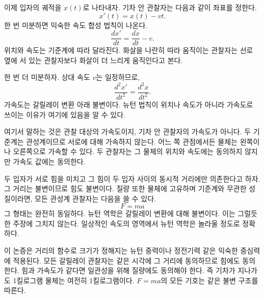 \begin{classroomqa}
\end{classroomqa}

이제 입자의 궤적을 \(x(t)\)로 나타내자. 기차 안 관찰자는 다음과 같이 좌표를 정한다.
\begin{equation}
x'(t)=x(t)-vt.
\end{equation}
한 번 미분하면 익숙한 속도 합성 법칙이 나온다.
\begin{equation}
\frac{dx'}{dt}=\frac{dx}{dt}-v.
\end{equation}
위치와 속도는 기준계에 따라 달라진다. 화살을 나란히 따라 움직이는 관찰자는 선로 옆에 서 있는 관찰자보다 화살이 더 느리게 움직인다고 본다.

한 번 더 미분하자. 상대 속도 \(v\)는 일정하므로,
\begin{equation}
\frac{d^2x'}{dt^2}=\frac{d^2x}{dt^2}.
\end{equation}
가속도는 갈릴레이 변환 아래 불변이다. 뉴턴 법칙이 위치나 속도가 아니라 가속도로 쓰이는 이유가 여기에 있음을 알 수 있다.

여기서 말하는 것은 관찰 대상의 가속도이지, 기차 안 관찰자의 가속도가 아니다. 두 기준계는 관성계이므로 서로에 대해 가속하지 않는다. 어느 쪽 관점에서든 물체는 왼쪽이나 오른쪽으로 가속할 수 있다. 두 관찰자는 그 물체의 위치와 속도에는 동의하지 않지만 가속도 값에는 동의한다.

두 입자가 서로 힘을 미치고 그 힘이 두 입자 사이의 동시적 거리에만 의존한다고 하자. 그 거리는 불변이므로 힘도 불변이다. 질량 또한 물체에 고유하며 기준계와 무관한 성질이라면, 모든 관성계 관찰자는 다음을 쓸 수 있다.
\begin{equation}
F=ma
\end{equation}
그 형태는 완전히 동일하다. 뉴턴 역학은 갈릴레이 변환에 대해 불변이다. 이는 그럴듯한 주장에 그치지 않는다. 일상적인 속도의 영역에서 뉴턴 역학은 놀라울 정도로 정확하다.

이 논증은 거리의 함수로 크기가 정해지는 뉴턴 중력이나 정전기력 같은 익숙한 중심력에 적용된다. 모든 갈릴레이 관찰자는 같은 시각에 그 거리에 동의하므로 힘에도 동의한다. 힘과 가속도가 같다면 일관성을 위해 질량에도 동의해야 한다. 즉 기차가 지나가도 1킬로그램 물체는 여전히 1킬로그램이다. \(F=ma\)의 모든 기호는 같은 불변 구조를 따른다.

